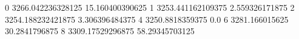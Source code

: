 0 3266.042236328125 15.160400390625
1 3253.441162109375 2.559326171875
2 3254.188232421875 3.306396484375
4 3250.8818359375 0.0
6 3281.166015625 30.2841796875
8 3309.17529296875 58.29345703125

